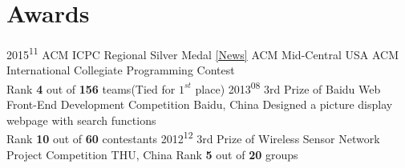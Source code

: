 \documentclass[]{luofei}
\begin{document}
\section{Awards}
\begin{entrylist}
\entry
{2015\textsuperscript{11}}
{ACM ICPC Regional Silver Medal \href{http://www.mccormick.northwestern.edu/eecs/news/articles/2015/eecs-teams-earn-top-10-finish-in-mid-central-regional-acm-icpc.html}{[News]}}
{ACM Mid-Central USA}
{ACM International Collegiate Programming Contest\\
Rank \textbf{4} out of \textbf{156} teams(Tied for $1^{st}$ place)
}  
\entry
{2013\textsuperscript{08}}
{3rd Prize of Baidu Web Front-End Development Competition}
{Baidu, China}
{Designed a picture display webpage with search functions\\
Rank \textbf{10} out of \textbf{60} contestants}
\entry
{2012\textsuperscript{12}}
{3rd Prize of Wireless Sensor Network Project Competition}
{THU, China}
{
Rank \textbf{5} out of \textbf{20} groups}
\end{entrylist}
\end{document}
